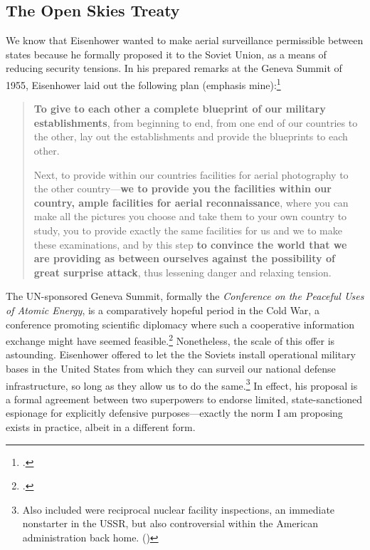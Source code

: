 \documentclass{report}
\begin{document}
\begin{refsegment}

\section{The Open Skies Treaty}
We know that Eisenhower wanted to make aerial surveillance permissible between states because he formally proposed it to the Soviet Union, as a means of reducing security tensions. In his prepared remarks at the Geneva Summit of 1955, Eisenhower laid out the following plan (emphasis mine):\footcite{eisenhower_president_1955}
	\begin{quote}
	\textbf{To give to each other a complete blueprint of our military establishments}, from beginning to end, from one end of our countries to the other, lay out the establishments and provide the blueprints to each other.
	\newline

	Next, to provide within our countries facilities for aerial photography to the other country---\textbf{we to provide you the facilities within our country, ample facilities for aerial reconnaissance}, where you can make all the pictures you choose and take them to your own country to study, you to provide exactly the same facilities for us and we to make these examinations, and by this step \textbf{to convince the world that we are providing as between ourselves against the possibility of great surprise attack}, thus lessening danger and relaxing tension.
	\end{quote}

The UN-sponsored Geneva Summit, formally the \emph{Conference on the Peaceful Uses of Atomic Energy}, is a comparatively hopeful period in the Cold War, a conference promoting scientific diplomacy where such a cooperative information exchange might have seemed feasible.\footcite[p.~27]{luscher_nuclear_2018} Nonetheless, the scale of this offer is astounding. Eisenhower offered to let the the Soviets install operational military bases in the United States from which they can surveil our national defense infrastructure, so long as they allow us to do the same.\footnote{Also included were reciprocal nuclear facility inspections, an immediate nonstarter in the USSR, but also controversial within the American administration back home. (\cite{prados_review_2015})} In effect, his proposal is a formal agreement between two superpowers to endorse limited, state-sanctioned espionage for explicitly defensive purposes---exactly the norm I am proposing exists in practice, albeit in a different form.


\end{refsegment}
\end{document}
